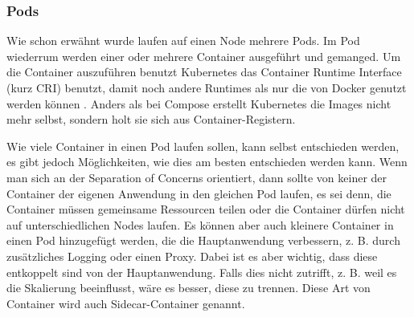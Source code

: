 \subsubsection{Pods}

Wie schon erwähnt wurde laufen auf einen Node mehrere Pods. Im Pod wiederrum werden einer oder mehrere Container ausgeführt und gemanged.
Um die Container auszuführen benutzt Kubernetes das Container Runtime Interface (kurz CRI) benutzt, damit noch andere Runtimes als nur die von Docker genutzt werden können \parencite[vgl. 108]{welter2024kubernetes}.
Anders als bei Compose erstellt Kubernetes die Images nicht mehr selbst, sondern holt sie sich aus Container-Registern.

Wie viele Container in einen Pod laufen sollen, kann selbst entschieden werden, es gibt jedoch Möglichkeiten, wie dies am besten entschieden werden kann.
Wenn man sich an der Separation of Concerns orientiert, dann sollte von keiner der Container der eigenen Anwendung in den gleichen Pod laufen, es sei denn, die Container müssen gemeinsame Ressourcen teilen oder die Container dürfen nicht auf unterschiedlichen Nodes laufen.
Es können aber auch kleinere Container in einen Pod hinzugefügt werden, die die Hauptanwendung verbessern, z. B. durch zusätzliches Logging oder einen Proxy. Dabei ist es aber wichtig, dass diese entkoppelt sind von der Hauptanwendung. Falls dies nicht zutrifft, z. B. weil es die Skalierung beeinflusst, wäre es besser, diese zu trennen.
Diese Art von Container wird auch Sidecar-Container genannt.

